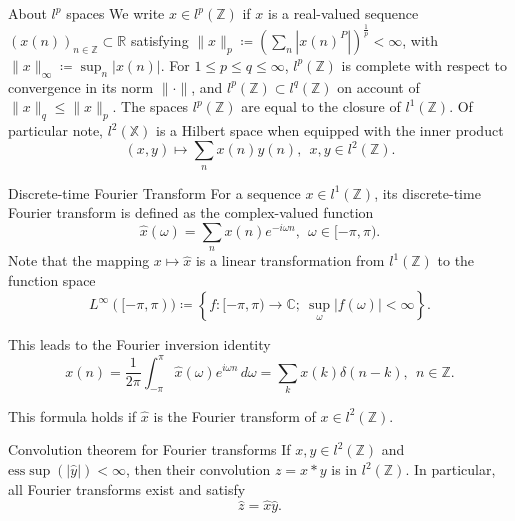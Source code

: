 \documentclass{article}
\begin{document}
\begin{misc}{About \( l^p \) spaces }{}
We write \( x\in l^p(\mathbb{Z} ) \) if \( x \) is a real-valued sequence \( (x(n))_{n \in \mathbb{Z} } \subset \mathbb{R}  \) satisfying \( \lVert x \rVert _p \coloneqq \left( \sum_{n} \left\lvert x(n)^P \right\rvert  \right)^\frac{1}{p} < \infty  \), with \( \lVert x \rVert _ \infty \coloneqq \sup _n\left\lvert x(n) \right\rvert  \). For \( 1\leq p\leq q \leq \infty  \), \( l^p(\mathbb{Z} ) \) is complete with respect to convergence in its norm \( \lVert \cdot  \rVert  \), and \( l^p(\mathbb{Z} )\subset l^q(\mathbb{Z} ) \) on account of \( \lVert x \rVert _q \leq  \lVert x \rVert _p \). The spaces \( l^p(\mathbb{Z} ) \)  are equal to the closure of \( l^1(\mathbb{Z} ) \). Of particular note, \( l^2(\mathbb{X} ) \) is a Hilbert space when equipped with the inner product
\[
    (x,y) \mapsto \sum_{n} x(n)y(n), \ \ x,y \in l^2(\mathbb{Z} ). 
\]
\end{misc}

\begin{defn}{Discrete-time Fourier Transform}{}
For a sequence \( x \in l^1(\mathbb{Z} ) \), its discrete-time Fourier transform is defined as the complex-valued function 
\[
    \hat{x} (\omega ) = \sum_{n} x(n)e^{-i \omega n}, \ \ \omega \in [- \pi ,\pi ).
\]
Note that the mapping \( x \mapsto \hat{x} \) is a linear transformation from \( l^1(\mathbb{Z} )\) to  the function space 
\[
    L^{\infty} ([-\pi, \pi ))\coloneqq \left\{ f:[- \pi ,\pi )\to \mathbb{C};  \ \sup _\omega |f(\omega )|< \infty   \right\}. 
\]

This leads to the Fourier inversion identity 
\[
    x(n) = \frac{1}{2\pi } \int_{- \pi }^{\pi } \hat{x} (\omega )e^{i \omega n}  \,d \omega  = \sum_{k} x(k)\delta (n - k) , \ \ n \in  \mathbb{Z}. 
\]

This formula holds if \( \hat{x}  \) is the Fourier transform of \( x\in l^2(\mathbb{Z} ) \). 



\end{defn}

\begin{thrm}{Convolution theorem for Fourier transforms}{}
If \( x,y \in l^2(\mathbb{Z} ) \) and \( \mathrm{ess}\sup (\left\lvert \hat{y}  \right\rvert ) < \infty  \), then their convolution \( z = x \ast y \) is in \( l^2(\mathbb{Z} ) \). In particular, all Fourier transforms exist and satisfy 
\[
    \hat{z} = \hat{x} \hat{y} . 
\]
\end{thrm}
\end{document}
